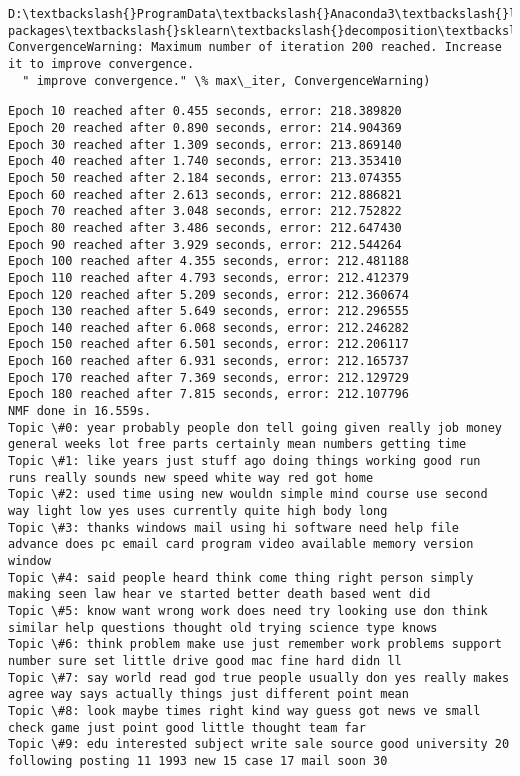 \documentclass[11pt]{article}
\begin{document}
    \begin{Verbatim}[commandchars=\\\{\}]
D:\textbackslash{}ProgramData\textbackslash{}Anaconda3\textbackslash{}lib\textbackslash{}site-packages\textbackslash{}sklearn\textbackslash{}decomposition\textbackslash{}nmf.py:1035: ConvergenceWarning: Maximum number of iteration 200 reached. Increase it to improve convergence.
  " improve convergence." \% max\_iter, ConvergenceWarning)

    \end{Verbatim}

    \begin{Verbatim}[commandchars=\\\{\}]
Epoch 10 reached after 0.455 seconds, error: 218.389820
Epoch 20 reached after 0.890 seconds, error: 214.904369
Epoch 30 reached after 1.309 seconds, error: 213.869140
Epoch 40 reached after 1.740 seconds, error: 213.353410
Epoch 50 reached after 2.184 seconds, error: 213.074355
Epoch 60 reached after 2.613 seconds, error: 212.886821
Epoch 70 reached after 3.048 seconds, error: 212.752822
Epoch 80 reached after 3.486 seconds, error: 212.647430
Epoch 90 reached after 3.929 seconds, error: 212.544264
Epoch 100 reached after 4.355 seconds, error: 212.481188
Epoch 110 reached after 4.793 seconds, error: 212.412379
Epoch 120 reached after 5.209 seconds, error: 212.360674
Epoch 130 reached after 5.649 seconds, error: 212.296555
Epoch 140 reached after 6.068 seconds, error: 212.246282
Epoch 150 reached after 6.501 seconds, error: 212.206117
Epoch 160 reached after 6.931 seconds, error: 212.165737
Epoch 170 reached after 7.369 seconds, error: 212.129729
Epoch 180 reached after 7.815 seconds, error: 212.107796
NMF done in 16.559s.
Topic \#0: year probably people don tell going given really job money general weeks lot free parts certainly mean numbers getting time
Topic \#1: like years just stuff ago doing things working good run runs really sounds new speed white way red got home
Topic \#2: used time using new wouldn simple mind course use second way light low yes uses currently quite high body long
Topic \#3: thanks windows mail using hi software need help file advance does pc email card program video available memory version window
Topic \#4: said people heard think come thing right person simply making seen law hear ve started better death based went did
Topic \#5: know want wrong work does need try looking use don think similar help questions thought old trying science type knows
Topic \#6: think problem make use just remember work problems support number sure set little drive good mac fine hard didn ll
Topic \#7: say world read god true people usually don yes really makes agree way says actually things just different point mean
Topic \#8: look maybe times right kind way guess got news ve small check game just point good little thought team far
Topic \#9: edu interested subject write sale source good university 20 following posting 11 1993 new 15 case 17 mail soon 30


    \end{Verbatim}
\end{document}
